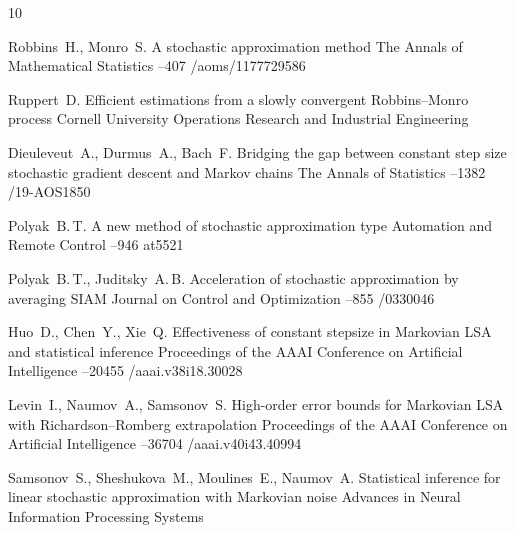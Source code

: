 \documentclass[blind]{psta}
\begin{document}

\begin{thebibliography}{10}

\by Robbins~H., Monro~S.
\paper A stochastic approximation method
\jour The Annals of Mathematical Statistics
--407
/aoms/1177729586

\by Ruppert~D.
\book Efficient estimations from a slowly convergent Robbins--Monro process
\publ Cornell University Operations Research and Industrial Engineering

\by Dieuleveut~A., Durmus~A., Bach~F.
\paper Bridging the gap between constant step size stochastic gradient
descent and Markov chains
\jour The Annals of Statistics
--1382
/19-AOS1850

\by Polyak~B.\,T.
\paper A new method of stochastic approximation type
\jour Automation and Remote Control
--946
\mathnet at5521

\by Polyak~B.\,T., Juditsky~A.\,B.
\paper Acceleration of stochastic approximation by averaging
\jour SIAM Journal on Control and Optimization
--855
/0330046

\by Huo~D., Chen~Y., Xie~Q.
\paper Effectiveness of constant stepsize in Markovian LSA and statistical
inference
\jour Proceedings of the AAAI Conference on Artificial Intelligence
--20455
/aaai.v38i18.30028

\by Levin~I., Naumov~A., Samsonov~S.
\paper High-order error bounds for Markovian LSA with Richardson--Romberg
extrapolation
\jour Proceedings of the AAAI Conference on Artificial Intelligence
--36704
/aaai.v40i43.40994

\by Samsonov~S., Sheshukova~M., Moulines~E., Naumov~A.
\paper Statistical inference for linear stochastic approximation with
Markovian noise
\jour Advances in Neural Information Processing Systems


\end{thebibliography}
\end{document}

